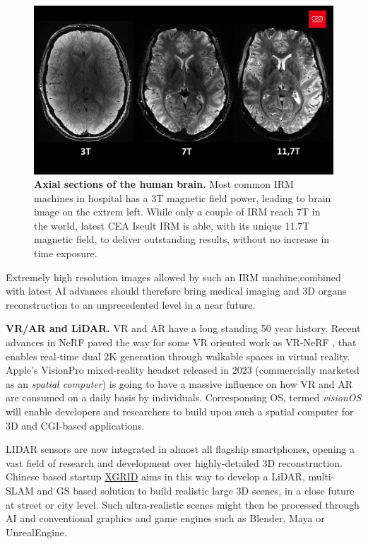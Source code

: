 \begin{figure}[htb!]
  \center
\includegraphics[width=\linewidth]{images/conclusion/cea-iseult.jpg}
\caption{\textbf{Axial sections of the human brain.} Most common IRM machines in hospital has a 3T magnetic field power, leading to brain image on the extrem left. While only a couple of IRM reach 7T in the world, latest CEA Iseult IRM is able, with its unique 11.7T magnetic field, to deliver outstanding results, without no increase in time exposure.}
\label{fig:conclusion-ceaiseult}
\end{figure}

Extremely high resolution images allowed by such an IRM machine,combined with latest \ac{AI} advances should therefore bring medical imaging and 3D organs reconstruction to an unprecedented level in a near future. 

\noindent \textbf{VR/AR and LiDAR.} \ac{VR} and \ac{AR} have a long standing 50 year history. Recent advances in \ac{NeRF} paved the way for some VR oriented work as VR-NeRF \citep{xu2023vr}, that enables real-time dual 2K generation through walkable spaces in virtual reality. Apple's VisionPro mixed-reality headset released in 2023 (commercially marketed as an \textit{spatial computer}) is going to have a massive influence on how \ac{VR} and \ac{AR} are consumed on a daily basis by individuals. Corresponsing OS, termed \textit{visionOS} will enable developers and researchers to build upon such a {spatial computer} for 3D and \ac{CGI}-based applications.

LIDAR sensors are now integrated in almost all flagship smartphones, opening a vast field of research and development over highly-detailed 3D reconstruction. Chinese based startup \href{https://www.xgrids.com/}{XGRID} aims in this way to develop a LiDAR, multi-SLAM and \ac{GS} based solution to build realistic large 3D scenes, in a close future at street or city level. Such ultra-realistic scenes might then be processed through \ac{AI} and conventional graphics and game engines such as Blender, Maya or UnrealEngine. 

